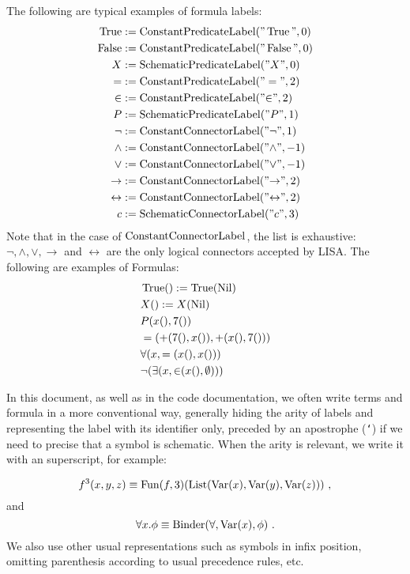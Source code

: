 \begin{ex}[Formula]The following are typical examples of formula labels:
  \begin{align*}
    \operatorname{True} &:= \operatorname{ConstantPredicateLabel}("\operatorname{True}", 0) \\
    \operatorname{False} &:= \operatorname{ConstantPredicateLabel}("\operatorname{False}", 0) \\
    X &:= \operatorname{SchematicPredicateLabel}("X", 0) \\
    = &:= \operatorname{ConstantPredicateLabel}("=", 2) \\
    {\in} &:= \operatorname{ConstantPredicateLabel}("{\in}", 2) \\
    P &:= \operatorname{SchematicPredicateLabel}("P", 1) \\
    \neg &:= \operatorname{ConstantConnectorLabel}("{\neg}", 1) \\
    \land &:= \operatorname{ConstantConnectorLabel}("{\land}", -1) \\
    \lor &:= \operatorname{ConstantConnectorLabel}("{\lor}", -1) \\
    \rightarrow &:= \operatorname{ConstantConnectorLabel}("{\rightarrow}", 2) \\
    \leftrightarrow &:= \operatorname{ConstantConnectorLabel}("{\leftrightarrow}", 2) \\
    c &:= \operatorname{SchematicConnectorLabel}("c", 3) \\
  \end{align*}
  Note that in the case of $\operatorname{ConstantConnectorLabel}$, the list is exhaustive: $\neg, \land, \lor, \rightarrow$ and $\leftrightarrow$ are the only logical connectors accepted by LISA.
  The following are examples of Formulas:
  \begin{align*}
    &\operatorname{True}() := \operatorname{True}(\operatorname{Nil})\\
    &X() := X(\operatorname{Nil})\\
    &P(x(), 7()) \\
    &=(+(7(), x()), +(x(), 7()))\\
    &\forall(x, =(x(), x())) \\
    &\neg(\exists(x, {\in}(x(), \emptyset)))
  \end{align*}
\end{ex}

In this document, as well as in the code documentation, we often write terms and formula in a more conventional way, generally hiding the arity of labels and representing the label with its identifier only, preceded by an apostrophe (\texttt{`}) if we need to precise that a symbol is schematic. When the arity is relevant, we write it with an superscript, for example:

$$
  f^3(x,y,z) \equiv \operatorname{Fun}(f, 3)(\operatorname{List}(\operatorname{Var}(x), \operatorname{Var}(y), \operatorname{Var}(z)))~,
$$
and
$$
  \forall x. \phi \equiv \operatorname{Binder}(\forall, \operatorname{Var}(x), \phi)~.
$$
We also use other usual representations such as symbols in infix position, omitting parenthesis according to usual precedence rules, etc.

